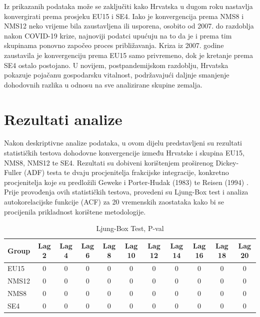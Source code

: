 \documentclass{crebsshr}
\begin{document}
Iz prikazanih podataka može se zaključiti kako Hrvatska u dugom roku nastavlja konvergirati prema prosjeku EU15 i SE4. Iako je konvergencija prema NMS8 i NMS12 neko vrijeme bila zaustavljena ili usporena, osobito od 2007. do razdoblja nakon COVID-19 krize, najnoviji podatci upućuju na to da je i prema tim skupinama ponovno započeo proces približavanja. Kriza iz 2007. godine zaustavila je konvergenciju prema EU15 samo privremeno, dok je kretanje prema SE4 ostalo postojano. U novijem, postpandemijskom razdoblju, Hrvatska pokazuje pojačanu gospodarsku vitalnost, podržavajući daljnje smanjenje dohodovnih razlika u odnosu na sve analizirane skupine zemalja.

\section{Rezultati analize}

Nakon deskriptivne analize podataka, u ovom dijelu predstavljeni su rezultati statističkih testova dohodovne konvergencije između Hrvatske i skupina EU15, NMS8, NMS12 te SE4. Rezultati su dobiveni korištenjem proširenog Dickey-Fuller (ADF) testa te dvaju procjenitelja frakcijske integracije, konkretno procjenitelja koje su predložili Geweke i Porter-Hudak (1983) \citep{Geweke1983} te Reisen (1994) \citep{Reisen1994}. Prije provođenja ovih statističkih testova, provedeni su Ljung-Box test i analiza autokorelacijske funkcije (ACF) za 20 vremenskih zaostataka kako bi se procijenila prikladnost korištene metodologije.

\begin{table}[ht]
\centering
\caption{Ljung-Box Test, P-val}
\label{tab:tablica1}
\begin{tabular}{lcccccccccc}
\toprule
\textbf{Group} & \textbf{Lag 2} & \textbf{Lag 4} & \textbf{Lag 6} & \textbf{Lag 8} & \textbf{Lag 10} & \textbf{Lag 12} & \textbf{Lag 14} & \textbf{Lag 16} & \textbf{Lag 18} & \textbf{Lag 20} \\
\midrule
EU15  & 0 & 0 & 0 & 0 & 0 & 0 & 0 & 0 & 0 & 0 \\
NMS12 & 0 & 0 & 0 & 0 & 0 & 0 & 0 & 0 & 0 & 0 \\
NMS8  & 0 & 0 & 0 & 0 & 0 & 0 & 0 & 0 & 0 & 0 \\
SE4   & 0 & 0 & 0 & 0 & 0 & 0 & 0 & 0 & 0 & 0 \\
\bottomrule
\end{tabular}
\end{table}
\end{document}
